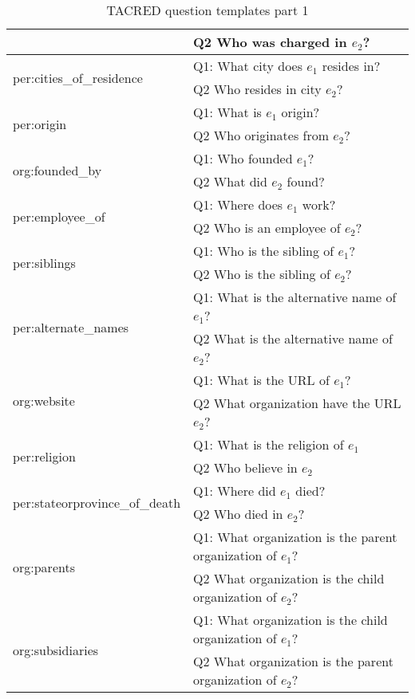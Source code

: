 \documentclass[11pt]{article}
\begin{document}
\begin{table*}[h]
{\begin{tabular}{|l|l|}
               & Q2 Who was charged in $e_2$?                 \\ \hline
\multirow{2}{*}{ per:cities\_of\_residence } & Q1:  What city does $e_1$ resides in?                 \\
               & Q2 Who resides in city $e_2$?                 \\ \hline
\multirow{2}{*}{ per:origin } & Q1:  What is $e_1$ origin?                 \\
               & Q2 Who originates from $e_2$?                 \\ \hline
\multirow{2}{*}{ org:founded\_by } & Q1:  Who founded $e_1$?                 \\
               & Q2 What did $e_2$ found?                 \\ \hline
\multirow{2}{*}{ per:employee\_of } & Q1:  Where does $e_1$ work?                 \\
               & Q2 Who is an employee of $e_2$?                 \\ \hline
\multirow{2}{*}{ per:siblings } & Q1:  Who is the sibling of $e_1$?                 \\
               & Q2 Who is the sibling of $e_2$?                 \\ \hline
\multirow{2}{*}{ per:alternate\_names } & Q1:  What is the alternative name of $e_1$?                 \\
               & Q2 What is the alternative name of $e_2$?                 \\ \hline
\multirow{2}{*}{ org:website } & Q1:  What is the URL of $e_1$?                 \\
               & Q2 What organization have the URL $e_2$?                 \\ \hline
\multirow{2}{*}{ per:religion } & Q1:  What is the religion of $e_1$                 \\
               & Q2 Who believe in $e_2$                 \\ \hline
\multirow{2}{*}{ per:stateorprovince\_of\_death } & Q1:  Where did $e_1$ died?                 \\
               & Q2 Who died in $e_2$?                 \\ \hline
\multirow{2}{*}{ org:parents } & Q1:  What organization is the parent organization of $e_1$?                 \\
               & Q2 What organization is the child organization of $e_2$?                 \\ \hline
\multirow{2}{*}{ org:subsidiaries } & Q1:  What organization is the child organization of $e_1$?                 \\
               & Q2 What organization is the parent organization of $e_2$?                 \\ \hline
\end{tabular}}
\caption{TACRED question templates part 1}
\label{tbl:tmp1}
\end{table*}
\end{document}
